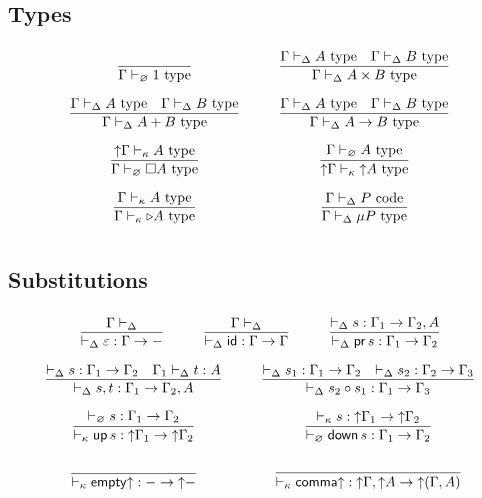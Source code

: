 \subsection*{Types}
\[\arraycolsep=15pt\def\arraystretch{2.8}
\begin{array}{cc}
\infer{\Gamma \vdash_{\varnothing} 1 \type}{} 
&
\infer{\Gamma \vdash_{\Delta} A \times B \type}{\Gamma \vdash_{\Delta} A \type & \Gamma \vdash_{\Delta} B \type}
\\
\infer{\Gamma \vdash_{\Delta} A + B \type}{\Gamma \vdash_{\Delta} A \type & \Gamma \vdash_{\Delta} B \type}
&
\infer{\Gamma \vdash_{\Delta} A \to B \type}{\Gamma \vdash_{\Delta} A \type & \Gamma \vdash_{\Delta} B \type} 
\\
\infer{\Gamma \vdash_{\varnothing} \square A \type}{\up \Gamma \vdash_{\kappa} A \type}
&
\infer{\up \Gamma \vdash_{\kappa} \up A \type}{\Gamma \vdash_{\varnothing} A \type}
\\
\infer{\Gamma \vdash_{\kappa} \later A \type}{\Gamma \vdash_{\kappa} A \type}
&
\infer{\Gamma \vdash_{\Delta} \mu P \type}{\Gamma \vdash_{\Delta} P \poly}
\end{array}
\]

\subsection*{Substitutions}
\[\arraycolsep=15pt\def\arraystretch{2.8}
\begin{array}{cc}
\multicolumn{2}{c}{
\infer{\vdash_{\Delta} \varepsilon : \Gamma \to -}{\Gamma \vdash_{\Delta}}
\qquad \quad
\infer{\vdash_{\Delta} \subid : \Gamma \to \Gamma}{\Gamma \vdash_{\Delta}}
\qquad \quad
\infer{\vdash_{\Delta} \subpr \, s : \Gamma_1 \to
  \Gamma_2}{\vdash_{\Delta} s : \Gamma_1 \to \Gamma_2 , A}
}
\\
\infer{\vdash_{\Delta} s , t : \Gamma_1 \to \Gamma_2 , A}{\vdash_{\Delta} s : \Gamma_1 \to \Gamma_2 & \Gamma_1 \vdash_{\Delta} t : A}
&
\infer{\vdash_{\Delta} s_2 \circ s_1 : \Gamma_1 \to \Gamma_3}{\vdash_{\Delta} s_1 : \Gamma_1 \to \Gamma_2 & \vdash_{\Delta} s_2 : \Gamma_2 \to \Gamma_3}
\\
\infer{\vdash_{\kappa} \mathsf{up} \,s : \up \Gamma_1\to \up
  \Gamma_2}{\vdash_{\varnothing} s : \Gamma_1 \to \Gamma_2}
&
\infer{\vdash_{\varnothing} \mathsf{down} \,s : \Gamma_1 \to
  \Gamma_2}{\vdash_{\kappa} s : \up \Gamma_1 \to \up \Gamma_2}
\\
\infer{\vdash_{\kappa} \mathsf{empty}\up : - \to \up -}{}
&
\infer{\vdash_{\kappa} \mathsf{comma}\up : \up \Gamma , \up A \to \up (\Gamma , A)}{}
\end{array}
\]

